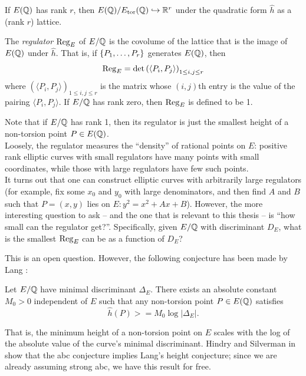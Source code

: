 \documentclass[10pt]{article}
\begin{document}
If $E(\mathbb{Q})$ has rank $r$, then $E(\mathbb{Q})/E_{\text{tor}}(\mathbb{Q}) \hookrightarrow \mathbb{R}^r$ under the quadratic form $\hat{h}$ as a (rank $r$) lattice.

\begin{definition}
The {\it regulator} $\operatorname{Reg}_E$ of $E/\mathbb{Q}$ is the covolume of the lattice that is the image of $E(\mathbb{Q})$ under $\hat{h}$. That is, if $\left\{P_1,\ldots,P_r\right\}$ generates $E(\mathbb{Q})$, then
\begin{equation}
	\operatorname{Reg}_E = \det\left(\langle P_i,P_j\rangle \right)_{1 \le i,j \le r}
\end{equation}
where $\left(\langle P_i,P_j\rangle \right)_{1 \le i,j \le r}$ is the matrix whose $(i,j)$th entry is the value of the pairing $\langle P_i,P_j\rangle$. If $E/\mathbb{Q}$ has rank zero, then $\operatorname{Reg}_E$ is defined to be 1.
\end{definition}
Note that if $E/\mathbb{Q}$ has rank 1, then its regulator is just the smallest height of a non-torsion point $P \in E(\mathbb{Q})$. \\

Loosely, the regulator measures the ``density'' of rational points on $E$: positive rank elliptic curves with small regulators have many points with small coordinates, while those with large regulators have few such points.\\

It turns out that one can construct elliptic curves with arbitrarily large regulators (for example, fix some $x_0$ and $y_0$ with large denominators, and then find $A$ and $B$ such that $P=(x,y)$ lies on $E: y^2 = x^2 + Ax + B$). However, the more interesting question to ask -- and the one that is relevant to this thesis -- is ``how small can the regulator get?''. Specifically, given $E/\mathbb{Q}$ with discriminant $D_E$, what is the smallest $\operatorname{Reg}_E$ can be as a function of $D_E$?

This is an open question. However, the following conjecture has been made by Lang \cite{Lang-1997}:

\begin{conjecture}
Let $E/\mathbb{Q}$ have minimal discriminant $\Delta_E$. There exists an absolute constant $M_0 >0$ independent of $E$ such that any non-torsion point $P \in E(\mathbb{Q})$ satisfies
\begin{equation}
\hat{h}(P) >= M_0 \log |\Delta_E| .
\end{equation}
\end{conjecture}
That is, the minimum height of a non-torsion point on $E$ scales with the log of the absolute value of the curve's minimal discriminant. Hindry and Silverman in \cite{HiS-1988} show that the abc conjecture implies Lang's height conjecture; since we are already assuming strong abc, we have this result for free. \\
\end{document}
